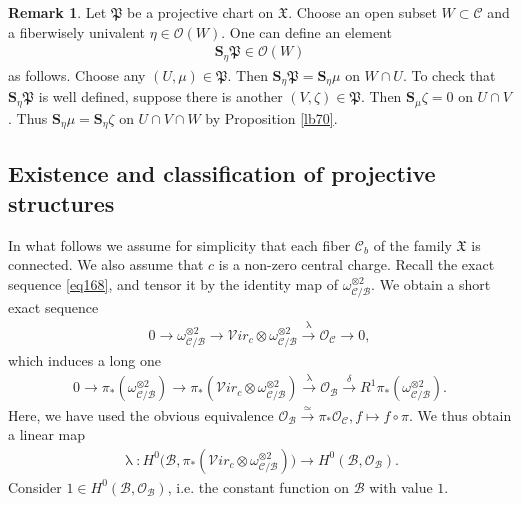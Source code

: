 \documentclass[12pt,a4paper,notitlepage]{report}
\theoremstyle{definition}
\newtheorem{rem}[df]{Remark}
\theoremstyle{plain}
\newcommand{\fk}{\mathfrak}
\newcommand{\mc}{\mathcal}
\newcommand{\scr}{\mathscr}
\newcommand{\svir}{\mathcal V\!\mathit{ir}}
\newcommand{\Sbf}{\mathbf{S}}
\numberwithin{equation}{section}
\begin{document}
\begin{rem}\label{lb75}
	Let $\fk P$ be a projective chart on $\fk X$. Choose an open subset $W\subset\mc C$ and a fiberwisely univalent $\eta\in\scr O(W)$. One can \index{S@$\Sbf_\eta f,\Sbf_\eta\fk P$} define an element 
	\begin{align*}
	\Sbf_\eta\fk P\in \scr O(W)
	\end{align*}
	as follows. Choose any $(U,\mu)\in\fk P$. Then $\Sbf_\eta\fk P=\Sbf_\eta\mu$ on $W\cap U$. To check that $\Sbf_\eta\fk P$ is well defined, suppose there is another $(V,\zeta)\in\fk P$. Then $\Sbf_\mu\zeta=0$ on $U\cap V$. Thus $\Sbf_\eta\mu=\Sbf_\eta\zeta$ on $U\cap V\cap W$ by Proposition \ref{lb70}.
\end{rem}



\subsection*{Existence and classification of projective structures}



In what follows we assume for simplicity that each fiber $\mc C_b$ of the family $\fk X$ is connected. We also assume that $c$ is a non-zero central charge. Recall the exact sequence \eqref{eq168}, and tensor it by the identity map of  $\omega_{\mc C/\mc B}^{\otimes 2}$. We obtain a short  exact sequence
\begin{align}
0\rightarrow \omega_{\mc C/\mc B}^{\otimes 2}\rightarrow\svir_c\otimes \omega_{\mc C/\mc B}^{\otimes 2}\xrightarrow{\uplambda}\scr O_{\mc C}\rightarrow 0,\label{eq174}
\end{align}
which induces a long one
\begin{align}
0\rightarrow\pi_*(\omega_{\mc C/\mc B}^{\otimes 2})\rightarrow \pi_*(\svir_c\otimes \omega_{\mc C/\mc B}^{\otimes 2})\xrightarrow{\uplambda} \scr O_{\mc B}\xrightarrow{\delta} R^1\pi_*(\omega_{\mc C/\mc B}^{\otimes 2}).\label{eq236}
\end{align}
Here, we have used the obvious equivalence $\scr O_{\mc B}\xrightarrow{\simeq}\pi_*\scr O_{\mc C},f\mapsto f\circ\pi$. We thus obtain a linear map
\begin{align}
\uplambda:H^0\big(\mc B,\pi_*(\svir_c\otimes \omega_{\mc C/\mc B}^{\otimes 2})\big)\rightarrow  H^0(\mc B,\scr O_{\mc B}).
\end{align}
Consider $1\in H^0(\mc B,\scr O_{\mc B})$, i.e. the constant function on $\mc B$ with value $1$.
\end{document}
